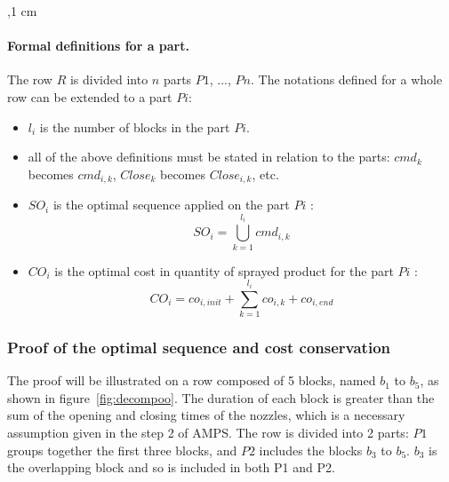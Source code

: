 ,1 cm
\paragraph{\textbf{Formal definitions for a part.}} 

The row $R$ is divided into $ n $ parts $ P1 $, ..., $Pn $.  The notations defined for a whole row can be extended to a part $ Pi $:%
\begin{itemize}
\item $l_{i}$ is the number of blocks in the part $Pi$.
\item all of the above definitions must be stated in relation to the parts: $cmd_{k}$ becomes $cmd_{i,k}$, $Close_k$ becomes $Close_{i,k}$, etc.
\item $SO_{i}$ is the optimal sequence applied on the part $Pi$ :
\begin{equation}
    SO_{i} = \overset{l_{i}}{\underset{k=1}{\bigcup}} cmd_{i,k} \label{eq:SOi}
\end{equation}
\item $CO_{i}$ is the optimal cost in quantity of sprayed product for the part $Pi$ :
\begin{equation}
    CO_i  = co_{i,init} + \overset{l_i}{\underset{k=1}{\sum}} co_{i,k} + co_{i,end} \label{eq:COi}
\end{equation}
\end{itemize}


\subsubsection{Proof of the optimal sequence and cost conservation} 



The proof will be illustrated on a row composed of 5 blocks, named $b_1$ to $ b_5 $, as shown in figure~\ref{fig:decompoo}. The duration of each block is greater than the sum of the opening and closing times of the nozzles, which is a necessary assumption given in the step 2 of AMPS. The row is divided into 2 parts: $ P1 $ groups together the first three blocks, and $ P2 $ includes the blocks $ b_3 $ to $ b_5 $. $b_{3}$ is the overlapping block and so is included in both P1 and P2.


